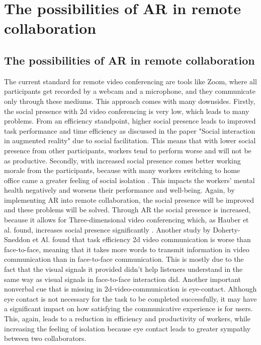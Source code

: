 \chapter{The possibilities of AR in remote collaboration }
\label{secMainPart}
\section{The possibilities of AR in remote collaboration}
The current standard for remote video conferencing are tools like Zoom, where all participants get recorded by a webcam and a microphone, and they communicate only through these mediums. This approach comes with many downsides. Firstly, the social presence with 2d video conferencing is very low, which leads to many problems. From an efficiency standpoint, higher social presence leads to improved task performance and time efficiency as discussed in the paper "Social interaction in augmented reality" \cite{10.1371/journal.pone.0216290} due to social facilitation. This means that with lower social presence from other participants, workers tend to perform worse and will not be as productive. Secondly, with increased social presence comes better working morale from the participants, because with many workers switching to home office came a greater feeling of social isolation \cite{joitmc7010070}. 
This impacts the workers' mental health negatively and worsens their performance and well-being. Again, by implementing AR into remote collaboration, the social presence will be improved and these problems will be solved. Through AR the social presence is increased, because it allows for Three-dimensional video conferencing which, as Hauber et al. found, increases social presence significantly \cite{2dSocialPresence}. Another study by Doherty-Sneddon et Al. \cite{taskPerformance} found that task efficiency 2d video communication is worse than face-to-face, meaning that it takes more words to transmit information in video communication than in face-to-face communication. This is mostly due to the fact that the visual signals it provided didn't help listeners understand in the same way as visual signals in face-to-face interaction did. Another important nonverbal cue that is missing in 2d-video-communication is eye-contact. Although eye contact is not necessary for the task to be completed successfully, it may have a significant impact on how satisfying the communicative experience is for users. This, again, leads to a reduction in efficiency and productivity of workers, while increasing the feeling of isolation because eye contact leads to greater sympathy between two collaborators.
